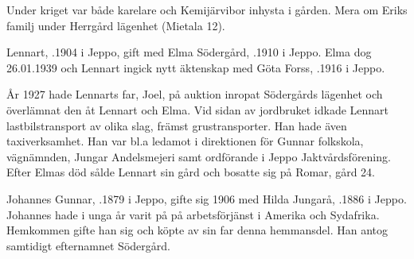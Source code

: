 Under kriget var både karelare och Kemijärvibor inhysta i gården. Mera om Eriks familj under Herrgård lägenhet (Mietala 12).


Lennart, .1904 i Jeppo, gift med Elma Södergård, .1910 i Jeppo. Elma dog 26.01.1939 och Lennart ingick nytt äktenskap med Göta Forss, .1916  i Jeppo.
\begin{jhchildren}
  \item {}
  \item {}
  \item {}
  \item {}
\end{jhchildren}

År 1927 hade Lennarts far, Joel, på auktion inropat Södergårds lägenhet och överlämnat den åt Lennart och Elma. Vid sidan av jordbruket idkade Lennart lastbilstransport av olika slag, främst grustransporter. Han hade även taxiverksamhet. Han var bl.a ledamot i direktionen för Gunnar folkskola, vägnämnden, Jungar Andelsmejeri samt ordförande i Jeppo Jaktvårdsförening. Efter Elmas död sålde Lennart sin gård och bosatte sig på Romar, gård 24.


Johannes Gunnar, .1879 i Jeppo, gifte sig 1906 med Hilda Jungarå, .1886 i Jeppo. Johannes hade i unga år varit på på arbetsförjänst i Amerika och Sydafrika. Hemkommen gifte han sig och köpte av sin far denna hemmansdel. Han antog samtidigt efternamnet Södergård.
\begin{jhchildren}
  \item {}
  \item {}
  \item {}
  \item {}
\end{jhchildren}

